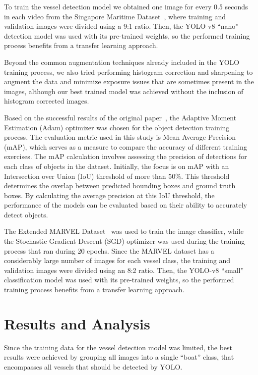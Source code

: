 \documentclass[a4paper,12pt]{article}
\begin{document}
\begin{multicols}{2}
To train the vessel detection model we obtained one image for every 0.5 seconds in each video from the Singapore Maritime Dataset~\cite{SINGAPORE}, where training and validation images were divided using a 9:1 ratio.
Then, the YOLO-v8 ``nano'' detection model was used with its pre-trained weights, so the performed training process benefits from a transfer learning approach.

Beyond the common augmentation techniques already included in the YOLO training process, we also tried performing histogram correction and sharpening to augment the data and minimize exposure issues that are sometimes present in the images, although our best trained model was achieved without the inclusion of histogram corrected images.

Based on the successful results of the original paper~\cite{MVDTHME}, the Adaptive Moment Estimation (Adam) optimizer was chosen for the object detection training process.
The evaluation metric used in this study is Mean Average Precision (mAP), which serves as a measure to compare the accuracy of different training exercises.
The mAP calculation involves assessing the precision of detections for each class of objects in the dataset.
Initially, the focus is on mAP with an Intersection over Union (IoU) threshold of more than 50\%.
This threshold determines the overlap between predicted bounding boxes and ground truth boxes.
By calculating the average precision at this IoU threshold, the performance of the models can be evaluated based on their ability to accurately detect objects.

The Extended MARVEL Dataset~\cite{MARVEL} was used to train the image classifier, while the Stochastic Gradient Descent (SGD) optimizer was used during the training process that ran during 20 epochs.
Since the MARVEL dataset has a considerably large number of images for each vessel class, the training and validation images were divided using an 8:2 ratio.
Then, the YOLO-v8 ``small'' classification model was used with its pre-trained weights, so the performed training process benefits from a transfer learning approach.

\section{Results and Analysis}\label{sec:results-and-analysis}

Since the training data for the vessel detection model was limited, the best results were achieved by grouping all images into a single ``boat'' class, that encompasses all vessels that should be detected by YOLO\@.


\end{multicols}
\end{document}
